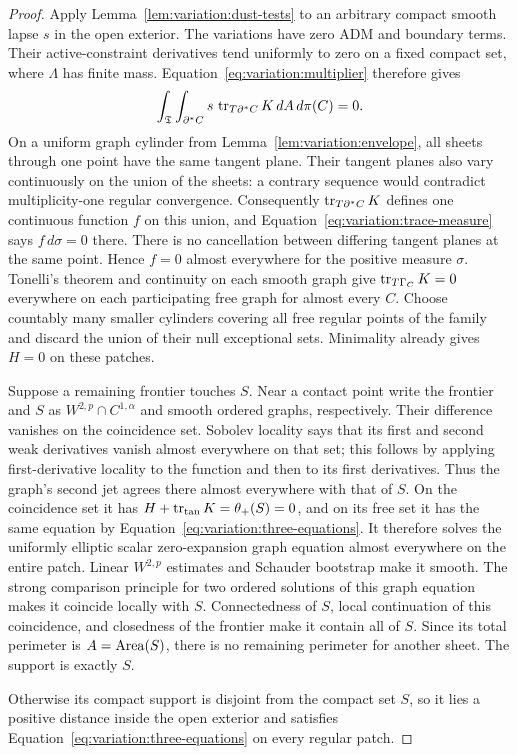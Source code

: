 \begin{proof}
Apply Lemma~\ref{lem:variation:dust-tests} to an arbitrary compact
smooth lapse $s$ in the open exterior.  The variations have zero ADM
and boundary terms.  Their active-constraint derivatives tend uniformly
to zero on a fixed compact set, where $\Lambda$ has finite mass.
Equation~\eqref{eq:variation:multiplier} therefore gives
\begin{equation}\label{eq:variation:trace-measure}
 \int_{\mathfrak T}\int_{\partial^*C}
           s\,\operatorname{tr}_{T\partial^*C}K\,dA\,d\pi(C)=0.
\end{equation}
On a uniform graph cylinder from
Lemma~\ref{lem:variation:envelope}, all sheets through one point have
the same tangent plane.  Their tangent planes also vary continuously
on the union of the sheets: a contrary sequence would contradict
multiplicity-one regular convergence.  Consequently
$\operatorname{tr}_{T\partial^*C}K$ defines one continuous function $f$ on this union,
and Equation~\eqref{eq:variation:trace-measure} says $f\,d\sigma=0$ there.
There is no cancellation between differing tangent planes at the same
point.  Hence $f=0$ almost everywhere for the positive measure
$\sigma$.  Tonelli's theorem and continuity on each smooth graph give
$\operatorname{tr}_{T\Gamma_C}K=0$ everywhere on each participating free graph for
almost every $C$.  Choose countably many smaller cylinders covering
all free regular points of the family and discard the union of their
null exceptional sets.  Minimality already gives $H=0$ on these
patches.

Suppose a remaining frontier touches $S$.  Near a contact point write
the frontier and $S$ as $W^{2,p}\cap C^{1,\alpha}$ and smooth ordered
graphs, respectively.  Their difference vanishes on the coincidence
set.  Sobolev locality says that its first and second weak derivatives
vanish almost everywhere on that set; this follows by applying
first-derivative locality to the function and then to its first
derivatives.  Thus the graph's second jet agrees there almost
everywhere with that of $S$.  On the coincidence set it has
$H+\operatorname{tr}_{\rm tan}K=\theta_+(S)=0$, and on its free set it has the same
equation by Equation~\eqref{eq:variation:three-equations}.  It therefore solves
the uniformly elliptic scalar zero-expansion graph equation almost
everywhere on the entire patch.  Linear $W^{2,p}$ estimates and
Schauder bootstrap make it smooth.  The strong comparison principle
for two ordered solutions of this graph equation makes it coincide
locally with $S$.  Connectedness of $S$, local continuation of this
coincidence, and closedness of the frontier make it contain all of
$S$.  Since its total perimeter is $A=\operatorname{Area}(S)$, there is no remaining
perimeter for another sheet.  The support is exactly $S$.

Otherwise its compact support is disjoint from the compact set $S$,
so it lies a positive distance inside the open exterior and satisfies
Equation~\eqref{eq:variation:three-equations} on every regular patch.
\end{proof}

